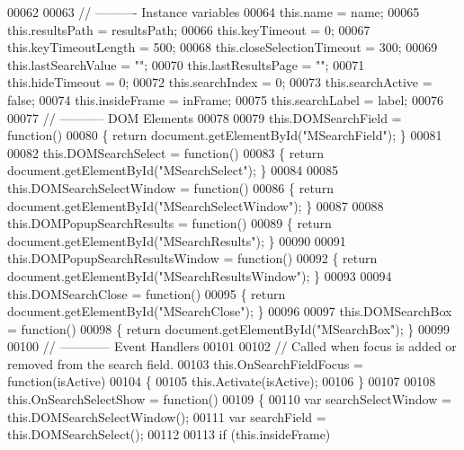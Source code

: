 \begin{DoxyCode}
00062 
00063   \textcolor{comment}{// ---------- Instance variables}
00064   this.name                  = name;
00065   this.resultsPath           = resultsPath;
00066   this.keyTimeout            = 0;
00067   this.keyTimeoutLength      = 500;
00068   this.closeSelectionTimeout = 300;
00069   this.lastSearchValue       = \textcolor{stringliteral}{""};
00070   this.lastResultsPage       = \textcolor{stringliteral}{""};
00071   this.hideTimeout           = 0;
00072   this.searchIndex           = 0;
00073   this.searchActive          = \textcolor{keyword}{false};
00074   this.insideFrame           = inFrame;
00075   this.searchLabel           = label;
00076 
00077   \textcolor{comment}{// ----------- DOM Elements}
00078 
00079   this.DOMSearchField = \textcolor{keyword}{function}()
00080   \{  \textcolor{keywordflow}{return} document.getElementById(\textcolor{stringliteral}{"MSearchField"});  \}
00081 
00082   this.DOMSearchSelect = \textcolor{keyword}{function}()
00083   \{  \textcolor{keywordflow}{return} document.getElementById(\textcolor{stringliteral}{"MSearchSelect"});  \}
00084 
00085   this.DOMSearchSelectWindow = \textcolor{keyword}{function}()
00086   \{  \textcolor{keywordflow}{return} document.getElementById(\textcolor{stringliteral}{"MSearchSelectWindow"});  \}
00087 
00088   this.DOMPopupSearchResults = \textcolor{keyword}{function}()
00089   \{  \textcolor{keywordflow}{return} document.getElementById(\textcolor{stringliteral}{"MSearchResults"});  \}
00090 
00091   this.DOMPopupSearchResultsWindow = \textcolor{keyword}{function}()
00092   \{  \textcolor{keywordflow}{return} document.getElementById(\textcolor{stringliteral}{"MSearchResultsWindow"});  \}
00093 
00094   this.DOMSearchClose = \textcolor{keyword}{function}()
00095   \{  \textcolor{keywordflow}{return} document.getElementById(\textcolor{stringliteral}{"MSearchClose"}); \}
00096 
00097   this.DOMSearchBox = \textcolor{keyword}{function}()
00098   \{  \textcolor{keywordflow}{return} document.getElementById(\textcolor{stringliteral}{"MSearchBox"});  \}
00099 
00100   \textcolor{comment}{// ------------ Event Handlers}
00101 
00102   \textcolor{comment}{// Called when focus is added or removed from the search field.}
00103   this.OnSearchFieldFocus = \textcolor{keyword}{function}(isActive)
00104   \{
00105     this.Activate(isActive);
00106   \}
00107 
00108   this.OnSearchSelectShow = \textcolor{keyword}{function}()
00109   \{
00110     var searchSelectWindow = this.DOMSearchSelectWindow();
00111     var searchField        = this.DOMSearchSelect();
00112 
00113     \textcolor{keywordflow}{if} (this.insideFrame)

\end{DoxyCode}
